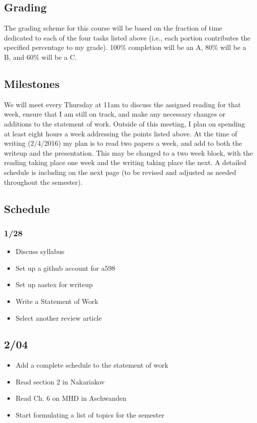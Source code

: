 \documentclass[12pt]{article}
\begin{document}
\subsection*{Grading}
The grading scheme for this course will be based on the fraction of
time dedicated to each
of the four tasks listed above (i.e., each portion contributes the
specified percentage to my grade). 100\% completion will be an A,
80\% will be a B, and 60\% will be a C.

\subsection*{Milestones}
We will meet every Thursday at 11am to discuss the assigned reading
for that week, ensure that I am still on track, and make any necessary
changes or additions to the statement of
work. Outside of this meeting, I plan on spending at least eight hours
a week addressing the points listed above. At the time of writing
(2/4/2016) my plan is to read two papers
a week, and add to both the writeup and the presentation. This may be
changed to a two
week block, with the reading taking place one week and the writing
taking place the next. A detailed schedule is including on
the next page (to be revised and adjusted as needed
throughout the semester).

\subsection*{Schedule}
\subsubsection*{1/28}
\begin{itemize}
    \item Discuss syllabus
    \item Set up a github account for a598
    \item Set up aastex for writeup
    \item Write a Statement of Work
    \item Select another review article
\end{itemize}

\subsection*{2/04}
\begin{itemize}
    \item Add a complete schedule to the statement of work
    \item Read section 2 in Nakariakov
    \item Read Ch. 6 on MHD in Aschwanden
    \item Start formulating a list of topics for the semester
\end{itemize}
\end{document}
